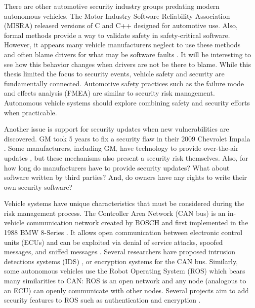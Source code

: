 \documentclass{article}
\begin{document}
There are other automotive security industry groups predating modern autonomous vehicles. The Motor Industry Software Reliability Association (MISRA) released versions of C and C++ designed for automotive use. Also, formal methods provide a way to validate safety in safety-critical software. However, it appears many vehicle manufacturers neglect to use these methods and often blame drivers for what may be software faults \citep{koopman_practical_2018}. It will be interesting to see how this behavior changes when drivers are not be there to blame. While this thesis limited the focus to security events, vehicle safety and security are fundamentally connected. Automotive safety practices such as the failure mode and effects analysis (FMEA) are similar to security risk management. Autonomous vehicle systems should explore combining safety and security efforts when practicable.

Another issue is support for security updates when new vulnerabilities are discovered. GM took 5 years to fix a security flaw in their 2009 Chevrolet Impala \citep{greenberg_gm_2015}. Some manufacturers, including GM, have technology to provide over-the-air updates \citep{2007-01-3523, 2014-01-0256, lewis_over--air_2016, alrabady_secure_2011}, but these mechanisms also present a security risk themselves. Also, for how long do manufacturers have to provide security updates? What about software written by third parties? And, do owners have any rights to write their own security software?

Vehicle systems have unique characteristics that must be considered during the risk management process. The Controller Area Network (CAN bus) is an in-vehicle communication network created by BOSCH and first implemented in the 1988 BMW 8-Series \citep{international_organization_for_standardization_iso_2015}. It allows open communication between electronic control units (ECUs) and can be exploited via denial of service attacks, spoofed messages, and sniffed messages \citep{kleberger_security_2011, miller_adventures_2014, miller_advanced_2016, miller_can_2016, smith_car_2016}. Several researchers have proposed intrusion detections systems (IDS) \citep{larson_approach_2008, muter_entropy-based_2011, boudguiga_simple_2016, song_intrusion_2016, kang_intrusion_2016, cho_fingerprinting_2016, daxin_tian_intrusion_2018, spicer_intrusion_2018}, or encryption systems \citep{bruton_securing_2014, wei_authenticated_2016, mukund_security_2015} for the CAN bus. Similarly, some autonomous vehicles use the Robot Operating System (ROS) which bears many similarities to CAN: ROS is an open network and any node (analogous to an ECU) can openly communicate with other nodes. Several projects aim to add security features to ROS such as authentication and encryption \citep{dieber_security_2017, breiling_secure_2017}.
\end{document}
